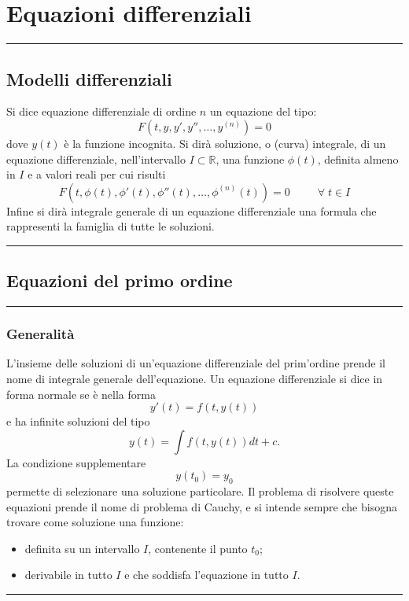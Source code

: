 \section*{Equazioni differenziali}
\rule{\textwidth}{2pt}
\subsection*{Modelli differenziali}
Si dice equazione differenziale di ordine $n$ un equazione del tipo:
\[
    F(t, y, y', y'', \dots, y^{(n)}) = 0
\]
dove $y(t)$ è la funzione incognita.\newline
Si dirà soluzione, o (curva) integrale, di un equazione differenziale, nell'intervallo $I \subset \mathbb{R}$, una funzione $\phi(t)$, definita almeno in $I$ e a valori reali per cui risulti
\[
    F(t, \phi(t), \phi'(t), \phi''(t), \dots, \phi^{(n)}(t))= 0 \;\;\;\;\;\;\;\; \;\forall\;t \in I
\]
Infine si dirà integrale generale di un equazione differenziale una formula che rappresenti la famiglia di tutte le soluzioni.\newline
\rule{\textwidth}{2pt}
\subsection*{Equazioni del primo ordine}
\rule{\textwidth}{0,4pt}
\subsubsection*{Generalità}
L'insieme delle soluzioni di un'equazione differenziale del prim'ordine prende il nome di integrale generale dell'equazione.\newline
Un equazione differenziale si dice in forma normale se è nella forma
\[
    y'(t) = f(t,y(t))
\]
e ha infinite soluzioni del tipo
\[
    y(t) = \int f(t, y(t)) dt + c .
\]
La condizione supplementare
\[
    y(t_0) = y_0
\]
permette di selezionare una soluzione particolare.\newline
Il problema di risolvere queste equazioni prende il nome di problema di Cauchy, e si intende sempre che bisogna trovare come soluzione una funzione:
\begin{itemize}
    \item definita su un intervallo $I$, contenente il punto $t_0$;
    \item derivabile in tutto $I$ e che soddisfa l'equazione in tutto $I$.
\end{itemize}
\rule{\textwidth}{0,4pt}
